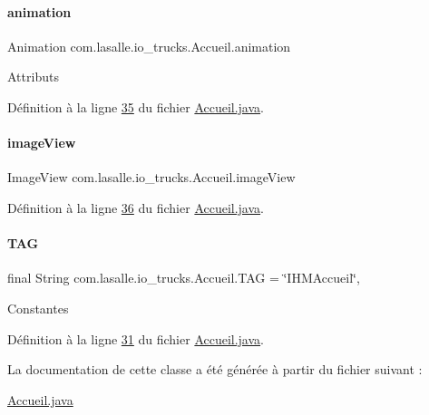 \paragraph{\texorpdfstring{animation}{animation}}
{\footnotesize\ttfamily Animation com.\+lasalle.\+io\+\_\+trucks.\+Accueil.\+animation\hspace{0.3cm}{\ttfamily [private]}}

Attributs 

Définition à la ligne \hyperlink{_accueil_8java_source_l00035}{35} du fichier \hyperlink{_accueil_8java_source}{Accueil.\+java}.

\mbox{\label{classcom_1_1lasalle_1_1io__trucks_1_1_accueil_a63484f52fc632e91aad7275ea7be0f7b}} 
\paragraph{\texorpdfstring{image\+View}{imageView}}
{\footnotesize\ttfamily Image\+View com.\+lasalle.\+io\+\_\+trucks.\+Accueil.\+image\+View\hspace{0.3cm}{\ttfamily [private]}}



Définition à la ligne \hyperlink{_accueil_8java_source_l00036}{36} du fichier \hyperlink{_accueil_8java_source}{Accueil.\+java}.

\mbox{\label{classcom_1_1lasalle_1_1io__trucks_1_1_accueil_a1a3ee3728fab660903bb4399a2e49d49}} 
\paragraph{\texorpdfstring{T\+AG}{TAG}}
{\footnotesize\ttfamily final String com.\+lasalle.\+io\+\_\+trucks.\+Accueil.\+T\+AG = \char`\"{}I\+H\+M\+Accueil\char`\"{}\hspace{0.3cm}{\ttfamily [static]}, {\ttfamily [private]}}

Constantes 

Définition à la ligne \hyperlink{_accueil_8java_source_l00031}{31} du fichier \hyperlink{_accueil_8java_source}{Accueil.\+java}.



La documentation de cette classe a été générée à partir du fichier suivant \+:\begin{DoxyCompactItemize}
\item 
\hyperlink{_accueil_8java}{Accueil.\+java}\end{DoxyCompactItemize}
